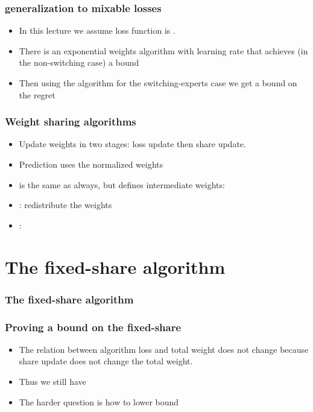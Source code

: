 \documentclass[handout]{beamer}
\begin{document}
\begin{small}
\begin{frame}
\frametitle{generalization to mixable losses}
\begin{itemize}
\item In this lecture we assume loss function is .
\item There is an exponential weights algorithm with learning rate \R{$\eta$} that 
achieves (in the non-switching case) a bound 
\item Then using the  algorithm for the switching-experts case 
we get a bound on the regret 
\end{itemize}
\end{frame}


\begin{frame}
\frametitle{Weight sharing algorithms}
\begin{itemize}
\item Update weights in two stages: loss update then share update.
\item Prediction uses the normalized  weights 
\item {} is the same as always, but defines intermediate  weights:
\R{\[
w_{t,i}^m = w_{t,i}^s e^{-\eta L(y_t,x_{t,i})}
\]}
\item {}: redistribute the weights
\item {}: 
\end{itemize}
\end{frame}

\section{The fixed-share algorithm}

\begin{frame}
\frametitle{The fixed-share algorithm}
\end{frame}

\begin{frame}
\frametitle{Proving a bound on the fixed-share}
\begin{itemize}
\item The relation between algorithm loss and total weight does not change
because share update does not change the total weight.
\item Thus we still have 
\R{\[
L_A \leq \frac{1}{\eta} \sum_{i=1}^n w_{l+1,i}^s
\]}
\item The harder question is how to lower bound 
\end{itemize}
\end{frame}


\end{small}
\end{document}
